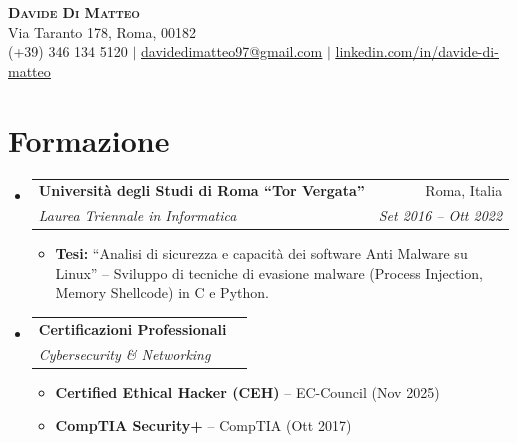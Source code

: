 \documentclass[letterpaper,11pt]{article}
\makeatletter
\newcommand{\resumeItem}[1]{\item\small{{#1\vspace{-2pt}}}}
\newcommand{\resumeSubheading}[4]{
  \vspace{-1pt}\item
  \begin{tabular*}{0.97\textwidth}[t]{l@{\extracolsep{\fill}}r}
    \textbf{#1} & #2 \\
    \textit{\small#3} & \textit{\small#4} \\
  \end{tabular*}\vspace{-3pt}
}
\newcommand{\resumeSubHeadingListStart}{\begin{itemize}[leftmargin=0.15in,label={},topsep=3pt,itemsep=4pt,parsep=0pt]}
\newcommand{\resumeSubHeadingListEnd}{\end{itemize}}
\newcommand{\resumeItemListStart}{\begin{itemize}[topsep=3pt,itemsep=2pt,parsep=0pt]}
\newcommand{\resumeItemListEnd}{\end{itemize}\vspace{-5pt}}
\makeatother
\begin{document}
\begin{center}
  \textbf{\Huge\scshape Davide Di Matteo} \\ \vspace{1pt}
  Via Taranto 178, Roma, 00182 \\ \vspace{1pt}
  \small (+39) 346 134 5120 $|$
  \href{mailto:davidedimatteo97@gmail.com}{\underline{davidedimatteo97@gmail.com}} $|$
  \href{https://linkedin.com/in/davide-di-matteo}{\underline{linkedin.com/in/davide-di-matteo}}
\end{center}

\section{Formazione}
\resumeSubHeadingListStart
  \resumeSubheading
    {Università degli Studi di Roma ``Tor Vergata''}{Roma, Italia}
    {Laurea Triennale in Informatica}{Set 2016 -- Ott 2022}
    \resumeItemListStart
      \resumeItem{\textbf{Tesi:} ``Analisi di sicurezza e capacità dei software Anti Malware su Linux'' -- Sviluppo di tecniche di evasione malware (Process Injection, Memory Shellcode) in C e Python.}
    \resumeItemListEnd
  \resumeSubheading{Certificazioni Professionali}{}{Cybersecurity \& Networking}{}
    \resumeItemListStart
      \resumeItem{\textbf{Certified Ethical Hacker (CEH)} -- EC-Council (Nov 2025)}
      \resumeItem{\textbf{CompTIA Security+} -- CompTIA (Ott 2017)}
    \resumeItemListEnd
\resumeSubHeadingListEnd
\end{document}
